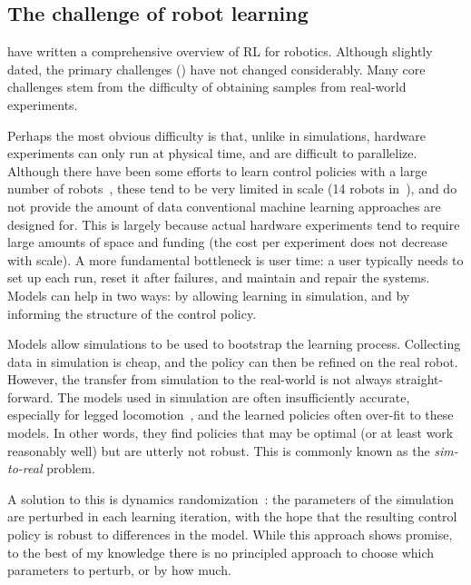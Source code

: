 \subsection{The challenge of robot learning}

\textcite{kober2013reinforcement} have written a comprehensive overview of RL for robotics. Although slightly dated, the primary challenges (\cite[see 8.1 in]{kober2013reinforcement}) have not changed considerably. Many core challenges stem from the difficulty of obtaining samples from real-world experiments. \par
Perhaps the most obvious difficulty is that, unlike in simulations, hardware experiments can only run at physical time, and are difficult to parallelize. Although there have been some efforts to learn control policies with a large number of robots~\cite{levine2018learning}, these tend to be very limited in scale (14 robots in~\cite{levine2018learning}), and do not provide the amount of data conventional machine learning approaches are designed for.
This is largely because actual hardware experiments tend to require large amounts of space and funding (the cost per experiment does not decrease with scale).
A more fundamental bottleneck is user time: a user typically needs to set up each run, reset it after failures, and maintain and repair the systems. Models can help in two ways: by allowing learning in simulation, and by informing the structure of the control policy.
 \par
Models allow simulations to be used to bootstrap the learning process. Collecting data in simulation is cheap, and the policy can then be refined on the real robot. However, the transfer from simulation to the real-world is not always straight-forward.
The models used in simulation are often insufficiently accurate, especially for legged locomotion~\cite{neunert2017off,tan2018sim}, and the learned policies often over-fit to these models. In other words, they find policies that may be optimal (or at least work reasonably well) but are utterly not robust. This is commonly known as the \emph{sim-to-real} problem. \par
A solution to this is dynamics randomization~\cite{peng2017sim,lowrey2018reinforcement,tan2018sim}: the parameters of the simulation are perturbed in each learning iteration, with the hope that the resulting control policy is robust to differences in the model. While this approach shows promise, to the best of my knowledge there is no principled approach to choose which parameters to perturb, or by how much. \par
